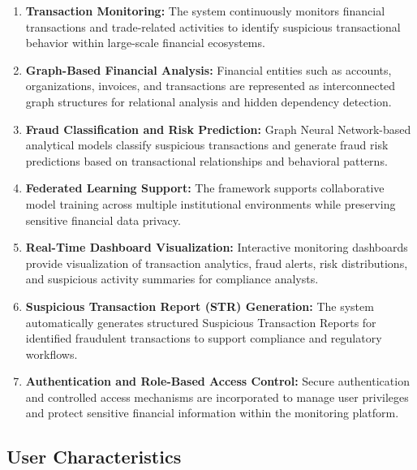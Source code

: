 \begin{enumerate}

\item \textbf{Transaction Monitoring:}  
The system continuously monitors financial transactions and trade-related activities to identify suspicious transactional behavior within large-scale financial ecosystems.

\item \textbf{Graph-Based Financial Analysis:}  
Financial entities such as accounts, organizations, invoices, and transactions are represented as interconnected graph structures for relational analysis and hidden dependency detection.

\item \textbf{Fraud Classification and Risk Prediction:}  
Graph Neural Network-based analytical models classify suspicious transactions and generate fraud risk predictions based on transactional relationships and behavioral patterns.

\item \textbf{Federated Learning Support:}  
The framework supports collaborative model training across multiple institutional environments while preserving sensitive financial data privacy.

\item \textbf{Real-Time Dashboard Visualization:}  
Interactive monitoring dashboards provide visualization of transaction analytics, fraud alerts, risk distributions, and suspicious activity summaries for compliance analysts.

\item \textbf{Suspicious Transaction Report (STR) Generation:}  
The system automatically generates structured Suspicious Transaction Reports for identified fraudulent transactions to support compliance and regulatory workflows.

\item \textbf{Authentication and Role-Based Access Control:}  
Secure authentication and controlled access mechanisms are incorporated to manage user privileges and protect sensitive financial information within the monitoring platform.

\end{enumerate}


\subsection[User Characteristics]{\textbf{User Characteristics}}

